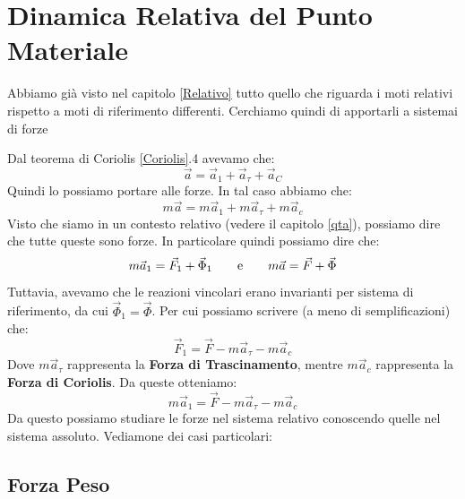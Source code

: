 \documentclass[11pt,a4paper,twoside]{article}
\theoremstyle{definition}
\begin{document}
\newpage

\section{Dinamica Relativa del Punto Materiale}

Abbiamo già visto nel capitolo \ref{Relativo} tutto quello che riguarda i moti relativi rispetto a moti di riferimento differenti. Cerchiamo quindi di apportarli a sistemai di forze
\begin{center}
\end{center}
Dal teorema di Coriolis \ref{Coriolis}.4 avevamo che:
\[ \vec a = \vec a_1 + \vec a_\tau + \vec a_C \]
Quindi lo possiamo portare alle forze. In tal caso abbiamo che:
\[ m\vec a = m\vec a_1 + m\vec a_\tau + m\vec a_c \]
Visto che siamo in un contesto relativo (vedere il capitolo \ref{qta}), possiamo dire che tutte queste sono forze. In particolare quindi possiamo dire che:
\[ m\vec a_1 = \vec F_1 + \vec\Phi_1 \qquad \text e \qquad m\vec a = \vec F + \vec \Phi\]
Tuttavia, avevamo che le reazioni vincolari erano invarianti per sistema di riferimento, da cui $\vec \Phi_1 = \vec \Phi$. Per cui possiamo scrivere (a meno di semplificazioni) che:
\[ \vec F_1 = \vec F - m\vec a_\tau - m\vec a_c \]
Dove $m\vec a_\tau$ rappresenta la \textbf{Forza di Trascinamento}, mentre $m\vec a_c$ rappresenta la \textbf{Forza di Coriolis}. Da queste otteniamo:
\[ m\vec a_1 = \vec F - m\vec a_\tau - m\vec a_c \]
Da questo possiamo studiare le forze nel sistema relativo conoscendo quelle nel sistema assoluto. Vediamone dei casi particolari:

\subsection{Forza Peso}
\end{document}
